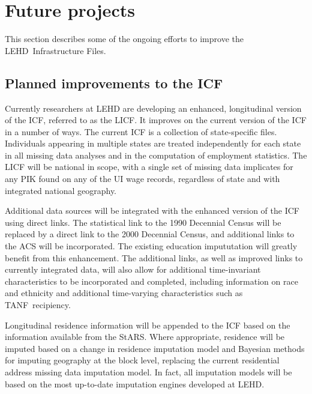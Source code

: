                       
%

\section{Future projects}

This section describes some of the ongoing efforts to improve the LEHD\
Infrastructure Files.

\subsection{Planned improvements to the ICF}

Currently researchers at LEHD are developing an enhanced, longitudinal
version of the ICF, referred to as the LICF. It improves on the current
version of the ICF in a number of ways. The current ICF is a collection of
state-specific files. Individuals appearing in multiple states are treated
independently for each state in all missing data analyses and in the
computation of employment statistics. The LICF will be national in scope,
with a single set of missing data implicates for any PIK found on any of the
UI wage records, regardless of state and with integrated national geography.

Additional data sources will be integrated with the enhanced version of the
ICF using direct links. The statistical link to the 1990 Decennial Census
will be replaced by a direct link to the 2000 Decennial Census, and
additional links to the ACS will be incorporated. The existing education
impututation will greatly benefit from this enhancement. The additional
links, as well as improved links to currently integrated data, will also
allow for additional time-invariant characteristics to be incorporated and
completed, including information on race and ethnicity and additional
time-varying characteristics such as TANF\ recipiency.

Longitudinal residence information will be appended to the ICF based on the
information available from the StARS. Where appropriate, residence will be
imputed based on a change in residence imputation model and Bayesian methods
for imputing geography at the block level, replacing the current residential
address missing data imputation model. In fact, all imputation models will
be based on the most up-to-date imputation engines developed at LEHD.

